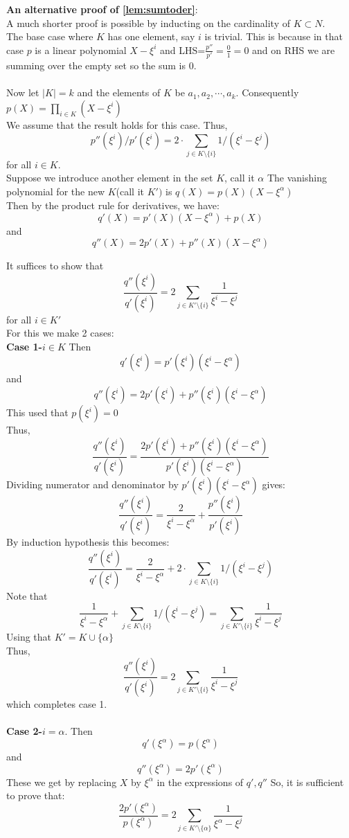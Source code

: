 \textbf{An alternative proof of \ref{lem:sumtoder}}:\\
A much shorter proof is possible by inducting on the cardinality of $K\subset N$.\\
The base case where $K$ has one element, say $i$ is trivial. This is because in that case $p$ is a linear polynomial $X-\xi^i$ and LHS=$\frac{p''}{p'}=\frac{0}{1}=0$ and on RHS we are summing over the empty set so the sum is $0$.\\\\
Now let $|K|=k$ and the elements of $K$ be $a_1, a_2, \cdots, a_k$.
Consequently $p(X)=\prod_{i \in K}(X-\xi^i)$\\
We assume that the result holds for this case. Thus,
$$p''(\xi^i)/p'(\xi^i)=2 \cdot \sum_{j\in K\setminus \{i\}} 1/(\xi^i-\xi^j)$$ for all $i \in K$.\\
Suppose we introduce another element in the set $K$, call it $\alpha$
The vanishing polynomial for the new $K$(call it $K')$ is $q(X)=p(X)(X-\xi^{\alpha})$\\
Then by the product rule for derivatives, we have:
$$q'(X)=p'(X)(X-\xi^{\alpha})+p(X)$$ and
$$q''(X)=2p'(X)+p''(X)(X-\xi^{\alpha})$$

It suffices to show that $$\frac{q''(\xi^i)}{q'(\xi^i)}=2\sum_{j\in K'\setminus \{i\}}\frac{1}{\xi^i-\xi^j}$$
for all $i \in K'$\\
For this we make 2 cases:\\
\textbf{Case 1-}$i \in K$
Then
$$q'(\xi^i)=p'(\xi^i)(\xi^i-\xi^{\alpha})$$ and
$$q''(\xi^i)=2p'(\xi^i)+p''(\xi^i)(\xi^i-\xi^{\alpha})$$
This used that $p(\xi^i)=0$\\
Thus, $$\frac{q''(\xi^i)}{q'(\xi^i)}=\frac{2p'(\xi^i)+p''(\xi^i)(\xi^i-\xi^{\alpha})}{p'(\xi^i)(\xi^i-\xi^{\alpha})}$$
Dividing numerator and denominator by $p'(\xi^i)(\xi^i-\xi^{\alpha})$ gives:
$$\frac{q''(\xi^i)}{q'(\xi^i)}=\frac{2}{\xi^i-\xi^\alpha}+\frac{p''(\xi^i)}{p'(\xi^i)}$$
By induction hypothesis this becomes:
$$\frac{q''(\xi^i)}{q'(\xi^i)}=\frac{2}{\xi^i-\xi^\alpha}+2 \cdot \sum_{j\in K\setminus \{i\}} 1/(\xi^i-\xi^j)$$
Note that $$\frac{1}{\xi^i-\xi^\alpha}+ \sum_{j\in K\setminus \{i\}} 1/(\xi^i-\xi^j)=\sum_{j\in K'\setminus \{i\}}\frac{1}{\xi^i-\xi^j}$$
Using that $K'=K \cup \{\alpha\}$\\
Thus, $$\frac{q''(\xi^i)}{q'(\xi^i)}=2\sum_{j\in K'\setminus \{i\}}\frac{1}{\xi^i-\xi^j}$$ which completes case 1. \\\\
\textbf{Case 2-}$i=\alpha$. Then
$$q'(\xi^{\alpha})=p(\xi^{\alpha})$$ and
$$q''(\xi^{\alpha})=2p'(\xi^{\alpha})$$
These we get by replacing $X$ by $\xi^{\alpha}$ in the expressions of $q', q''$
So, it is sufficient to prove that:
$$\frac{2p'(\xi^{\alpha})}{p(\xi^{\alpha})}=2\sum_{j\in K'\setminus \{\alpha\}}\frac{1}{\xi^{\alpha}-\xi^j}$$


